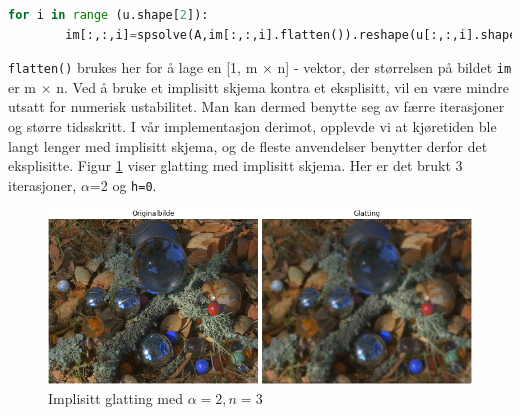 \begin{lstlisting}[language=Python]
    for i in range (u.shape[2]):
        im[:,:,i]=spsolve(A,im[:,:,i].flatten()).reshape(u[:,:,i].shape)
\end{lstlisting}
\texttt{flatten()} brukes her for å lage en [1, m $\times$ n] - vektor, der størrelsen på bildet \texttt{im} er m $\times$ n. Ved å bruke et implisitt skjema kontra et eksplisitt, vil en være mindre utsatt for numerisk ustabilitet. Man kan dermed benytte seg av færre iterasjoner og større tidsskritt. I vår implementasjon derimot, opplevde vi at kjøretiden ble langt lenger med implisitt skjema, og de fleste anvendelser benytter derfor det eksplisitte. Figur \ref{fig:glattingImp} viser glatting med implisitt skjema. Her er det brukt 3 iterasjoner, $\alpha$=2 og \texttt{h=0}.

\begin{figure}[H]
\begin{center}
    \includegraphics[width=1\columnwidth]{bilder/Glatting/impGlatt.png}
    \caption{Implisitt glatting med $\alpha=2, n=3$~ \label{fig:glattingImp}}
\end{center}
\end{figure}